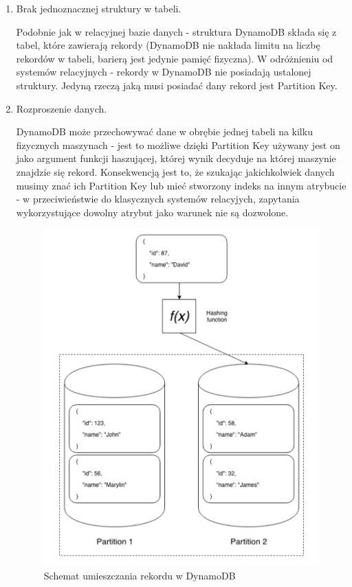 \begin{enumerate}
    \item Brak jednoznacznej struktury w tabeli.

Podobnie jak w relacyjnej bazie danych - struktura DynamoDB składa się z tabel, które zawierają rekordy (DynamoDB nie nakłada limitu na liczbę rekordów w tabeli, barierą jest jedynie pamięć fizyczna). W odróżnieniu od systemów relacyjnych - rekordy w DynamoDB nie posiadają ustalonej struktury. Jedyną rzeczą jaką musi posiadać dany rekord jest Partition Key.

    \item Rozproszenie danych.

DynamoDB może przechowywać dane w obrębie jednej tabeli na kilku fizycznych maszynach - jest to możliwe dzięki Partition Key używany jest on jako argument funkcji haszującej, której wynik decyduje na której maszynie znajdzie się rekord. Konsekwencją jest to, że szukając jakichkolwiek danych musimy znać ich Partition Key lub mieć stworzony indeks na innym atrybucie - w przeciwieństwie do klasycznych systemów relacyjych, zapytania wykorzystujące dowolny atrybut jako warunek nie są dozwolone.

    \begin{figure}[H]
    \includegraphics[width=11cm]{dynamo_partitions.png}
    \centering
    \caption{Schemat umieszczania rekordu w DynamoDB}
    \end{figure} 


\end{enumerate}
